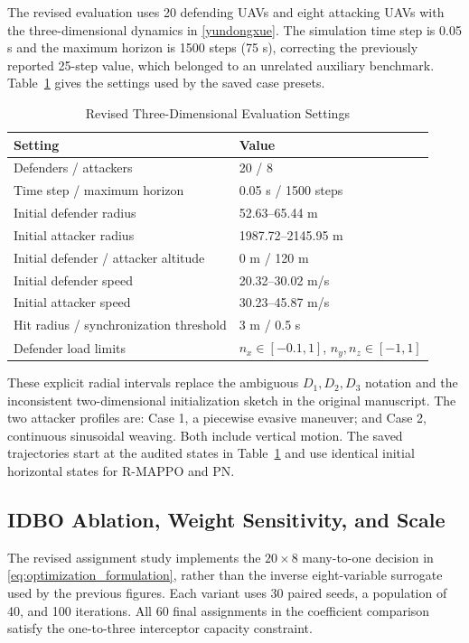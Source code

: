 \documentclass[lettersize,journal]{IEEEtran}
\begin{document}
{The revised evaluation uses 20 defending UAVs and eight attacking UAVs with the
three-dimensional dynamics in \eqref{yundongxue}. The simulation time step is
0.05 s and the maximum horizon is 1500 steps (75 s), correcting the previously
reported 25-step value, which belonged to an unrelated auxiliary benchmark.
Table~\ref{tab:revised_setup} gives the settings used by the saved case presets.

\begin{table}[!t]
\centering
\caption{Revised Three-Dimensional Evaluation Settings}
\label{tab:revised_setup}
\footnotesize
\renewcommand{\arraystretch}{1.12}
\begin{tabular}{p{}p{}}
\toprule
Setting & Value \\
\midrule
Defenders / attackers & 20 / 8 \\
Time step / maximum horizon & 0.05 s / 1500 steps \\
Initial defender radius & 52.63--65.44 m \\
Initial attacker radius & 1987.72--2145.95 m \\
Initial defender / attacker altitude & 0 m / 120 m \\
Initial defender speed & 20.32--30.02 m/s \\
Initial attacker speed & 30.23--45.87 m/s \\
Hit radius / synchronization threshold & 3 m / 0.5 s \\
Defender load limits & \(n_x\in[-0.1,1]\), \(n_y,n_z\in[-1,1]\) \\
\bottomrule
\end{tabular}
\end{table}

These explicit radial intervals replace the ambiguous \(D_1,D_2,D_3\) notation
and the inconsistent two-dimensional initialization sketch in the original
manuscript. The two attacker profiles are: Case 1, a piecewise evasive maneuver;
and Case 2, continuous sinusoidal weaving. Both include vertical motion. The
saved trajectories start at the audited states in Table~\ref{tab:revised_setup}
and use identical initial horizontal states for R-MAPPO and PN.

\subsection{IDBO Ablation, Weight Sensitivity, and Scale}
\label{subsec:idbo_results}

The revised assignment study implements the \(20\times8\) many-to-one decision
in \eqref{eq:optimization_formulation}, rather than the inverse eight-variable
surrogate used by the previous figures. Each variant uses 30 paired seeds, a
population of 40, and 100 iterations. All 60 final assignments in the coefficient
comparison satisfy the one-to-three interceptor capacity constraint.

}
\end{document}
